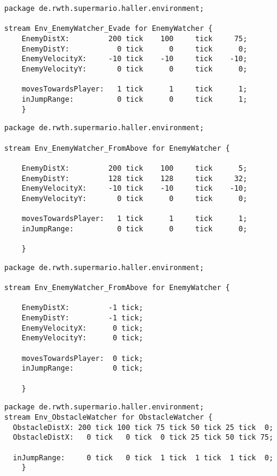 \begin{lstlisting}[label=lst:enemywatchertest_1, caption=Enemy watcher stream test, morekeywords={package, stream, tick, for},
frame=single, basicstyle=\small]
package de.rwth.supermario.haller.environment;

stream Env_EnemyWatcher_Evade for EnemyWatcher {
    EnemyDistX:         200 tick    100     tick     75;
    EnemyDistY:           0 tick      0     tick      0;
    EnemyVelocityX:     -10 tick    -10     tick    -10;
    EnemyVelocityY:       0 tick      0     tick      0;
            
    movesTowardsPlayer:   1 tick      1     tick      1;
    inJumpRange:          0 tick      0     tick      1;
    }
\end{lstlisting}

\begin{lstlisting}[label=lst:enemywatchertest_2, caption=Enemy watcher stream test, morekeywords={package, stream, tick, for},
frame=single, basicstyle=\small]
package de.rwth.supermario.haller.environment;

stream Env_EnemyWatcher_FromAbove for EnemyWatcher {
        
    EnemyDistX:         200 tick    100     tick      5;
    EnemyDistY:         128 tick    128     tick     32;
    EnemyVelocityX:     -10 tick    -10     tick    -10;
    EnemyVelocityY:       0 tick      0     tick      0;
            
    movesTowardsPlayer:   1 tick      1     tick      1;
    inJumpRange:          0 tick      0     tick      0;

    }
\end{lstlisting}

\begin{lstlisting}[label=lst:enemywatchertest_3, caption=Enemy watcher stream test, morekeywords={package, stream, tick, for},
frame=single, basicstyle=\small]
package de.rwth.supermario.haller.environment;

stream Env_EnemyWatcher_FromAbove for EnemyWatcher {
        
    EnemyDistX:         -1 tick;
    EnemyDistY:         -1 tick;
    EnemyVelocityX:      0 tick;
    EnemyVelocityY:      0 tick;
            
    movesTowardsPlayer:  0 tick;
    inJumpRange:         0 tick;

    }
\end{lstlisting}

\begin{lstlisting}[label=lst:obstaclewatchertest, caption=Obstacle watcher stream test, morekeywords={package, stream, tick, for},
frame=single, basicstyle=\small]
package de.rwth.supermario.haller.environment;
stream Env_ObstacleWatcher for ObstacleWatcher {
  ObstacleDistX: 200 tick 100 tick 75 tick 50 tick 25 tick  0;
  ObstacleDistX:   0 tick   0 tick  0 tick 25 tick 50 tick 75;
    
  inJumpRange:     0 tick   0 tick  1 tick  1 tick  1 tick  0;
    }
\end{lstlisting}

